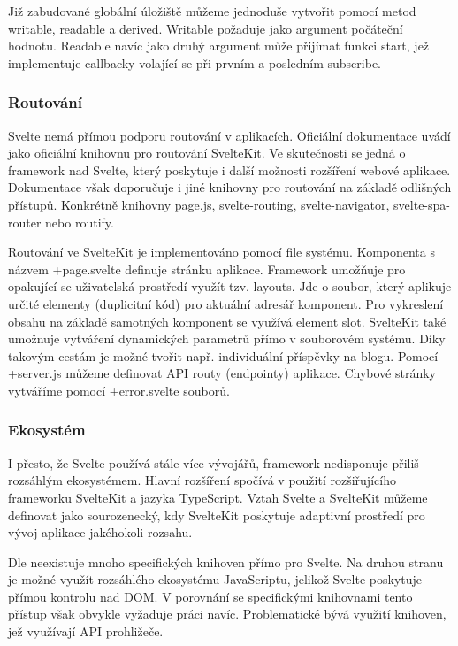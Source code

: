Již zabudované globální úložiště můžeme jednoduše vytvořit pomocí metod writable, readable a derived. Writable požaduje jako argument počáteční hodnotu. 
Readable navíc jako druhý argument může přijímat funkci start, jež implementuje callbacky volající se při prvním a posledním subscribe.\cite{sveltehandbook,svelte,sveltestatemanagement}

\subsubsection{Routování}

Svelte nemá přímou podporu routování v aplikacích. Oficiální dokumentace uvádí jako oficiální knihovnu pro routování SvelteKit. 
Ve skutečnosti se jedná o framework nad Svelte, který poskytuje i další možnosti rozšíření webové aplikace. 
Dokumentace však doporučuje i jiné knihovny pro routování na základě odlišných přístupů. 
Konkrétně knihovny page.js, svelte-routing, svelte-navigator, svelte-spa-router nebo routify.\cite{svelte,svelteforbeginners}

Routování ve SvelteKit je implementováno pomocí file systému. Komponenta s názvem +page.svelte definuje stránku aplikace. 
Framework umožňuje pro opakující se uživatelská prostředí využít tzv. layouts. Jde o soubor, který aplikuje určité elementy (duplicitní kód) pro aktuální adresář komponent. 
Pro vykreslení obsahu na základě samotných komponent se využívá element slot. SvelteKit také umožnuje vytváření dynamických parametrů přímo v souborovém systému. 
Díky takovým cestám je možné tvořit např. individuální příspěvky na blogu. Pomocí +server.js můžeme definovat API routy (endpointy) aplikace. 
Chybové stránky vytváříme pomocí +error.svelte souborů.\cite{svelte,sveltekit}

\subsubsection{Ekosystém}

I přesto, že Svelte používá stále více vývojářů, framework nedisponuje přiliš rozsáhlým ekosystémem. Hlavní rozšíření spočívá v použití rozšiřujícího frameworku SvelteKit a jazyka TypeScript. 
Vztah Svelte a SvelteKit můžeme definovat jako sourozenecký, kdy SvelteKit poskytuje adaptivní prostředí pro vývoj aplikace jakéhokoli rozsahu.

Dle \cite{sveltedailydev} neexistuje mnoho specifických knihoven přímo pro Svelte. 
Na druhou stranu je možné využít rozsáhlého ekosystému JavaScriptu, jelikož Svelte poskytuje přímou kontrolu nad DOM. 
V porovnání se specifickými knihovnami tento přístup však obvykle vyžaduje práci navíc. 
Problematické bývá využití knihoven, jež využívají API prohližeče.\cite{svelteheyreliable,sveltedailydev,sveltejslibs}
